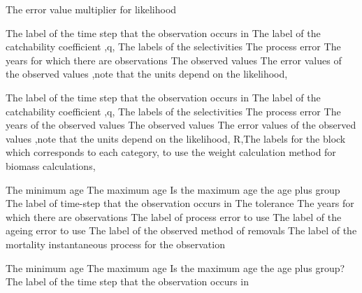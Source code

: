  {The error value multiplier for likelihood}
\par\textbf{}\par
{} {The label of the time step that the observation occurs in}
 {The label of the catchability coefficient ,q,}
 {The labels of the selectivities}
 {The process error}
 {The years for which there are observations}
 {The observed values}
 {The error values of the observed values ,note that the units depend on the likelihood,}
\par\textbf{}\par
{} {The label of the time step that the observation occurs in}
 {The label of the catchability coefficient ,q,}
 {The labels of the selectivities}
 {The process error}
 {The years of the observed values}
 {The observed values}
 {The error values of the observed values ,note that the units depend on the likelihood,}
 {R,The labels for the  block which corresponds to each category, to use the weight calculation method for biomass calculations,}
\par\textbf{}\par
{} {The minimum age}
 {The maximum age}
 {Is the maximum age the age plus group}
 {The label of time-step that the observation occurs in}
 {The tolerance}
 {The years for which there are observations}
 {The label of process error to use}
 {The label of the ageing error to use}
 {The label of the observed method of removals}
 {The label of the mortality instantaneous process for the observation}
\par\textbf{}\par
{} {The minimum age}
 {The maximum age}
 {Is the maximum age the age plus group?}
 {The label of the time step that the observation occurs in}
